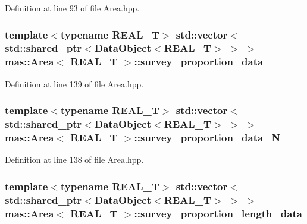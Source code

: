Definition at line 93 of file Area.\-hpp.

\hypertarget{structmas_1_1_area_adfe5f97ac7d375c9045b3a17a3c9ccf6}{
\subsubsection[{survey\-\_\-proportion\-\_\-data}]{\setlength{\rightskip}{0pt plus 5cm}template$<$typename R\-E\-A\-L\-\_\-\-T$>$ std\-::vector$<$std\-::shared\-\_\-ptr$<${\bf Data\-Object}$<$R\-E\-A\-L\-\_\-\-T$>$ $>$ $>$ {\bf mas\-::\-Area}$<$ R\-E\-A\-L\-\_\-\-T $>$\-::survey\-\_\-proportion\-\_\-data}}\label{structmas_1_1_area_adfe5f97ac7d375c9045b3a17a3c9ccf6}


Definition at line 139 of file Area.\-hpp.

\hypertarget{structmas_1_1_area_a1a00923508e1f489be3f5885c9208a75}{
\subsubsection[{survey\-\_\-proportion\-\_\-data\-\_\-\-N}]{\setlength{\rightskip}{0pt plus 5cm}template$<$typename R\-E\-A\-L\-\_\-\-T$>$ std\-::vector$<$std\-::shared\-\_\-ptr$<${\bf Data\-Object}$<$R\-E\-A\-L\-\_\-\-T$>$ $>$ $>$ {\bf mas\-::\-Area}$<$ R\-E\-A\-L\-\_\-\-T $>$\-::survey\-\_\-proportion\-\_\-data\-\_\-\-N}}\label{structmas_1_1_area_a1a00923508e1f489be3f5885c9208a75}


Definition at line 138 of file Area.\-hpp.

\hypertarget{structmas_1_1_area_a267134d80dcd5d56d4e63b158ebaacdf}{
\subsubsection[{survey\-\_\-proportion\-\_\-length\-\_\-data}]{\setlength{\rightskip}{0pt plus 5cm}template$<$typename R\-E\-A\-L\-\_\-\-T$>$ std\-::vector$<$std\-::shared\-\_\-ptr$<${\bf Data\-Object}$<$R\-E\-A\-L\-\_\-\-T$>$ $>$ $>$ {\bf mas\-::\-Area}$<$ R\-E\-A\-L\-\_\-\-T $>$\-::survey\-\_\-proportion\-\_\-length\-\_\-data}}\label{structmas_1_1_area_a267134d80dcd5d56d4e63b158ebaacdf}


